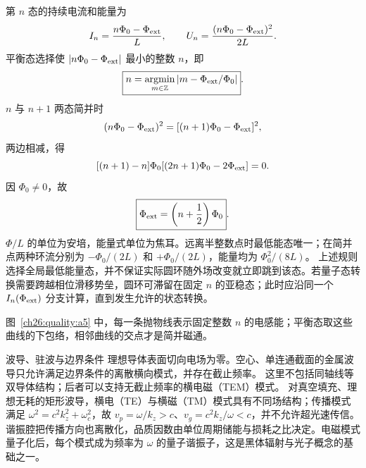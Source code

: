 {\begin{xesolution}
\begin{center}
\begin{minipage}{.96\linewidth}
\end{minipage}\end{center}

第 $n$ 态的持续电流和能量为
\[
 I_n=\frac{n\Phi_0-\Phi_{\rm ext}}{L},
 \qquad
 U_n=\frac{(n\Phi_0-\Phi_{\rm ext})^2}{2L}.
\]
平衡态选择使 $|n\Phi_0-\Phi_{\rm ext}|$ 最小的整数 $n$，即
\[
 \boxed{n=\operatorname*{argmin}_{m\in\mathbb Z}|m-\Phi_{\rm ext}/\Phi_0|}.
\]
$n$ 与 $n+1$ 两态简并时
\[
 (n\Phi_0-\Phi_{\rm ext})^2=[(n+1)\Phi_0-\Phi_{\rm ext}]^2,
\]
两边相减，得
\[
 [(n+1)-n]\Phi_0[(2n+1)\Phi_0-2\Phi_{\rm ext}]=0.
\]
因 $\Phi_0\ne0$，故
\[
 \boxed{\Phi_{\rm ext}=\left(n+\frac12\right)\Phi_0}.
\]
$\Phi/L$ 的单位为安培，能量式单位为焦耳。远离半整数点时最低能态唯一；在简并点两种环流分别为 $-\Phi_0/(2L)$ 和 $+\Phi_0/(2L)$，能量均为 $\Phi_0^2/(8L)$。
上述规则选择全局最低能量态，并不保证实际圆环随外场改变就立即跳到该态。若量子态转换需要跨越相位滑移势垒，圆环可滞留在固定 $n$ 的亚稳态；此时应沿同一个 $I_n(\Phi_{\rm ext})$ 分支计算，直到发生允许的状态转换。

图~\ref{ch26:quality:a5} 中，每一条抛物线表示固定整数 $n$ 的电感能；平衡态取这些曲线的下包络，相邻曲线的交点才是简并磁通。
\end{xesolution}

\begin{starread}{波导、驻波与边界条件}
理想导体表面切向电场为零。空心、单连通截面的金属波导只允许满足边界条件的离散横向模式，并存在截止频率。
这里不包括同轴线等双导体结构；后者可以支持无截止频率的横电磁（TEM）模式。
对真空填充、理想无耗的矩形波导，横电（TE）与横磁（TM）模式具有不同场结构；传播模式满足 $\omega^2=c^2k_z^2+\omega_c^2$，故 $v_p=\omega/k_z>c$、$v_g=c^2k_z/\omega<c$，并不允许超光速传信。
谐振腔把传播方向也离散化，品质因数由单位周期储能与损耗之比决定。电磁模式量子化后，每个模式成为频率为
$\omega$ 的量子谐振子，这是黑体辐射与光子概念的基础之一。
\end{starread}

}

